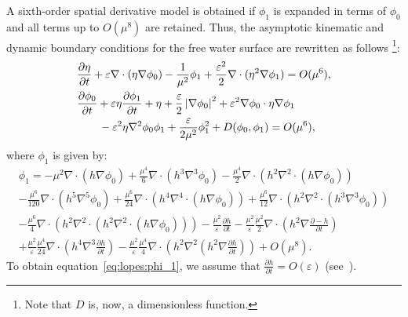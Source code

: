 A sixth-order spatial derivative model is obtained if $\phi_1$ is
expanded in terms of $\phi_0$ and all terms up to $O(\mu^8)$ are
retained.  Thus, the asymptotic kinematic and dynamic boundary
conditions for the free water surface are rewritten as follows
\footnote{Note that $D$ is, now, a dimensionless function.}:
\begin{subequations}
  \label{eq:lopes:kindyn}
  \begin{align}
    &\displaystyle\frac{\partial \eta}{\partial
      t}+\varepsilon\nabla\cdot(\eta\nabla\phi_0) -
    \frac{1}{\mu^2}\phi_1 +
    \frac{\varepsilon^2}{2}\nabla\cdot(\eta^2\nabla\phi_1)=O(\mu^{6}),
    \vspace{0.3cm}\\ &\displaystyle
    \frac{\partial \phi_0}{\partial t}+\varepsilon\eta\frac{\partial
      \phi_1}{\partial t}+\eta + \frac{\varepsilon}{2}
    \left|\nabla\phi_0\right|^2 +
    \varepsilon^2\nabla\phi_0\cdot\eta\nabla\phi_1\nonumber
    \\ & \displaystyle \qquad
    -\varepsilon^2\eta\nabla^2\phi_0\phi_1
    +\frac{\varepsilon}{2\mu^2}\phi_1^2
    +D(\phi_0,\phi_1)
    =O(\mu^{6}),
  \end{align}
\end{subequations}
where $\phi_1$ is given by:
\begin{multline}\label{eq:lopes:phi_1}
  \phi_1= -\mu^{2}\nabla\cdot\left(h\nabla\phi_0\right)
  +\frac{\mu^{4}}{6}\nabla\cdot\left(h^3\nabla^3\phi_0\right)
  -\frac{\mu^{4}}{2}\nabla\cdot\left(h^2
    \nabla^2\cdot\left(h\nabla\phi_0\right) \right)\\
  -\frac{\mu^6}{120}\nabla\cdot\left(h^5\nabla^5\phi_0\right)+
  \frac{\mu^6}{24}\nabla\cdot\left(h^4\nabla^4\cdot
    \left(h\nabla\phi_0\right)\right) +
  \frac{\mu^6}{12}\nabla\cdot\left(h^2\nabla^2\cdot
    \left(h^3\nabla^3\phi_0\right)\right)\\
  - \frac{\mu^6}{4}\nabla\cdot\left(h^2\nabla^2 \cdot
    \left(h^2\nabla^2\cdot\left(h\nabla\phi_0\right)\right)\right)
  -\frac{\mu^2}{\varepsilon}\frac{\partial h}{\partial t}-
  \frac{\mu^2}{\varepsilon}\frac{\mu^2}{2}\nabla \cdot
  \left(h^2\nabla\frac{\partial - h}{\partial t}\right)\\
  +\frac{\mu^2}{\varepsilon}\frac{\mu^4}{24}\nabla \cdot
  \left(h^4\nabla^3 \frac{\partial h}{\partial t}\right)
  -\frac{\mu^2}{\varepsilon}\frac{\mu^4}{4}\nabla \cdot
  \left(h^2\nabla^2\left(h^2\nabla\frac{\partial h}{\partial
        t}\right)\right)+O(\mu^{8}).
\end{multline}
To obtain equation~\eqref{eq:lopes:phi_1}, we assume that
$\displaystyle\frac{\partial h}{\partial t}=O(\varepsilon)$
(see~\citet{DutykhDias2007}).

